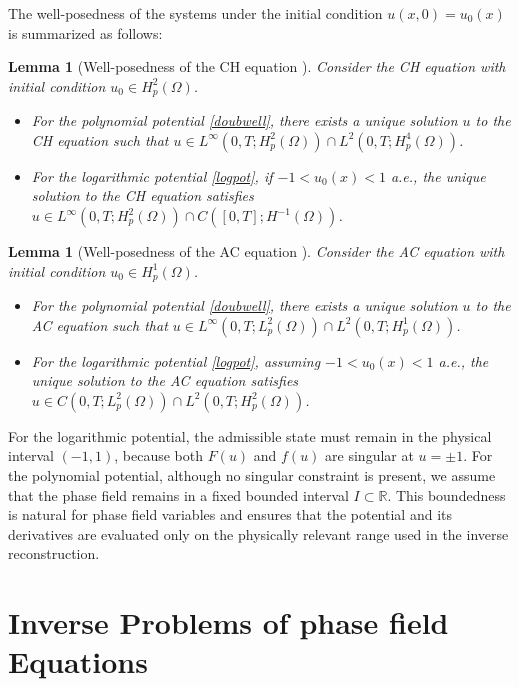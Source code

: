 \documentclass[11pt,reqno]{amsart}
\newtheorem{lemma}[theorem]{Lemma}
\begin{document}
The well-posedness of the systems under the initial condition $u(x,0) = u_0(x)$ is summarized as follows:

\begin{lemma}[Well-posedness of the CH equation \cite{miranville2019cahn,cherfils2011cahn}]
\label{lemma:CH}
Consider the CH equation with initial condition $u_0 \in H^2_p(\Omega)$. 
\begin{itemize}
    \item[1.] For the polynomial potential \eqref{doubwell}, there exists a unique solution $u$ to the CH equation such that $u \in L^{\infty}(0,T; H^2_p(\Omega)) \cap L^2(0,T; H^4_p(\Omega))$. 
    \item[2.] For the logarithmic potential \eqref{logpot}, if $-1 < u_0(x) < 1$ a.e., the unique solution to the CH equation satisfies $u \in L^\infty(0, T; H_p^2(\Omega)) \cap C([0, T]; H^{-1}(\Omega))$.
\end{itemize}
\end{lemma}

\begin{lemma}[Well-posedness of the AC equation \cite{ladyzhenskaia1968linear,bertacco2021stochastic}]
\label{lemma:AC}
Consider the AC equation with initial condition $u_0 \in H_p^1(\Omega)$. 
\begin{itemize}
    \item[1.] For the polynomial potential \eqref{doubwell}, there exists a unique solution $u$ to the AC equation such that $u \in L^{\infty}(0,T;L_p^2(\Omega))\cap L^2(0,T;H_p^1(\Omega))$. 
    \item[2.] For the logarithmic potential \eqref{logpot}, assuming $-1 < u_0(x) < 1$ a.e., the unique solution to the AC equation satisfies $u \in C(0,T; L_p^2(\Omega)) \cap L^2(0,T; H_p^2(\Omega))$.
\end{itemize}
\end{lemma}

For the logarithmic potential, the admissible state must remain in the physical interval $(-1,1)$, because both $F(u)$ and $f(u)$ are singular at $u=\pm1$.  For the polynomial potential, although no singular constraint is present, we assume that the phase field remains in a fixed bounded interval $I\subset\mathbb{R}$. This boundedness is natural for phase field variables and ensures that the potential and its derivatives are evaluated only on the physically relevant range used in the inverse reconstruction.


\section{Inverse Problems of phase field Equations}
\end{document}
